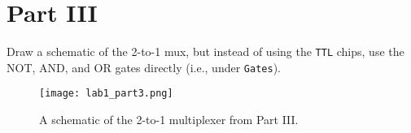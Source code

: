 \documentclass{article}
\begin{document}
\newpage
\section*{Part III}

Draw a schematic of the 2-to-1 mux, but instead of using the \verb|TTL| chips, use the NOT, AND, and OR gates directly (i.e., under \verb|Gates|).

\begin{figure}[!ht]
    \centering
    \texttt{[image: lab1\_part3.png]}
    \caption{A schematic of the 2-to-1 multiplexer from Part III.}
    \label{f:part3}
\end{figure}
\end{document}
